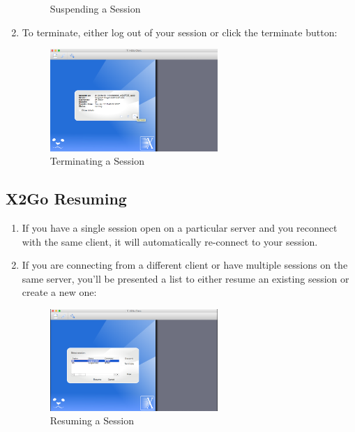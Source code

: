 \begin{enumerate}[resume]
\begin{figure}[!htb]
	\caption{Suspending a Session}
	\label{fig:fig8}
\end{figure}
	\item To terminate, either log out of your session or click the terminate button:
\begin{figure}[!htb]
	\centering
	\includegraphics[width=0.6\textwidth]{src/images/image9.png}
	\caption{Terminating a Session}
	\label{fig:fig9}
\end{figure}
\end{enumerate}
\subsection{X2Go Resuming}
\begin{enumerate}[resume]
	\item If you have a single session open on a particular server and you reconnect with the same client, it will automatically re-connect to your session.
	\item If you are connecting from a different client or have multiple sessions on the same server, you'll be presented a list to either resume an existing session or create a new one:
\begin{figure}[!htb]
	\centering
	\includegraphics[width=0.6\textwidth]{src/images/image10.png}
	\caption{Resuming a Session}
	\label{fig:fig10}
\end{figure}
\end{enumerate}
